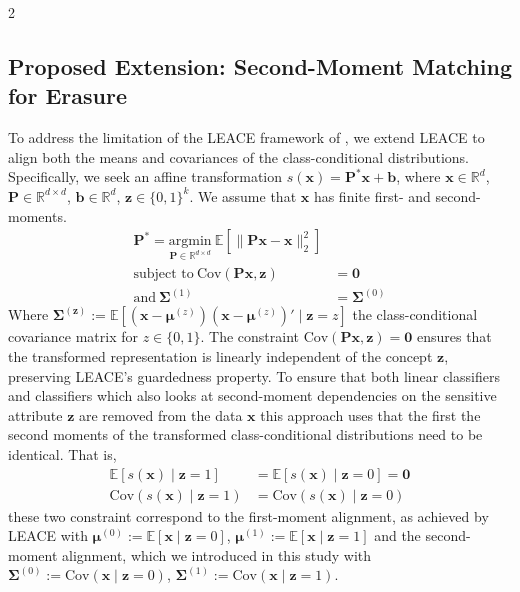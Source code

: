 \documentclass[ecta,nameyear,final]{econsocart}
\numberwithin{equation}{section}
\theoremstyle{plain}
\theoremstyle{definition}
\begin{document}
\begin{multicols}{2}
\subsection{Proposed Extension: Second-Moment Matching for Erasure}
To address the limitation of the LEACE framework of \cite{Belrose2023}, we extend LEACE to align both the means and covariances of the class-conditional distributions.
\newline \newline
Specifically, we seek an affine transformation $s(\mathbf{x{}}) = \mathbf{P}^*\mathbf{x} + \mathbf{b}$, where $\mathbf{x} \in \mathbb{R}^d$, $\mathbf{P} \in \mathbb{R}^{d \times d}$, $\mathbf{b} \in \mathbb{R}^d$, $\mathbf{z}\in \{0,1\}^k$. We assume that $\mathbf{x}$ has finite first- and second-moments.
\begin{align}
        \mathbf{P}^{*} = \underset{\mathbf{P} \in \mathbb{R}^{d \times d}}{\text{argmin}} \  \mathbb{E}\left[ \| \mathbf{Px} - \mathbf{x} \|^2_{2} \right] \\ \text{subject to} \ \text{Cov}(\mathbf{Px}, \mathbf{z}) &= \mathbf{0} \\ \text{and} \ \boldsymbol{\Sigma}^{(1)} &= \boldsymbol{\Sigma}^{(0)}
\end{align}
Where $\boldsymbol{\Sigma^{(z)}} := \mathbb{E}[(\mathbf{x} - \boldsymbol{\mu}^{(z)})(\mathbf{x} - \boldsymbol{\mu}^{(z)})' \mid \mathbf{z}=z] $ the class-conditional covariance matrix for $z \in\{0,1\}$. The constraint $\text{Cov}(\mathbf{Px}, \mathbf{z}) = \mathbf{0}$ ensures that the transformed representation is linearly independent of the concept $\mathbf{z}$, preserving LEACE's guardedness property.
\newline \newline
To ensure that both linear classifiers and classifiers which also looks at second-moment dependencies on the sensitive attribute $\mathbf{z}$ are removed from the data $\mathbf{x}$ this approach uses that the first the second moments of the transformed class-conditional distributions need to be identical. That is,
\begin{align}
    \mathbb{E}[s(\mathbf{x}) \mid \mathbf{z} = 1] &= \mathbb{E}[s(\mathbf{x}) \mid \mathbf{z} = 0] = \mathbf{0}\\
    \text{Cov}(s(\mathbf{x}) \mid \mathbf{z} = 1) &= \text{Cov}(s(\mathbf{x}) \mid \mathbf{z} = 0)
\end{align}
these two constraint correspond to the first-moment alignment, as achieved by LEACE with $\boldsymbol{\mu}^{(0)}:=\mathbb{E}[\mathbf{x} \mid \mathbf{z} = 0]$, $\boldsymbol{\mu}^{(1)}:=\mathbb{E}[\mathbf{x} \mid \mathbf{z} = 1]$ and the second-moment alignment, which we introduced in this study with $\boldsymbol{\Sigma}^{(0)} := \text{Cov}(\mathbf{x} \mid \mathbf{z} = 0)$, $\boldsymbol{\Sigma}^{(1)} := \text{Cov}(\mathbf{x} \mid \mathbf{z} = 1)$.

\end{multicols}
\end{document}
